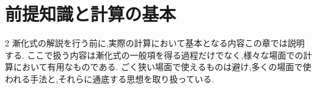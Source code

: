 
\chapter{前提知識と計算の基本}\label{章：前提知識と計算の基本}
\begin{multicols*}{2}
  漸化式の解説を行う前に,実際の計算において基本となる内容この章では説明する.
  ここで扱う内容は漸化式の一般項を得る過程だけでなく,様々な場面での計算において有用なものである.
  ごく狭い場面で使えるものは避け,多くの場面で使われる手法と,それらに通底する思想を取り扱っている.




\end{multicols*}

